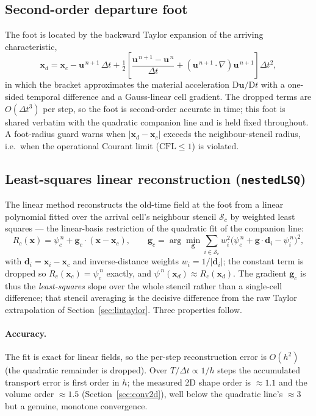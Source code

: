 \documentclass[preprint,3p,11pt]{elsarticle}
\newcommand{\psilev}{\psi}
\newcommand{\uvec}{\mathbf{u}}
\newcommand{\xc}{\mathbf{x}_c}
\newcommand{\xd}{\mathbf{x}_d}
\begin{document}
\subsection{Second-order departure foot}
\label{sec:foot}
The foot is located by the backward Taylor expansion of the arriving
characteristic,
\begin{equation}
  \xd = \xc - \uvec^{\,n+1}\,\Delta t
        + \tfrac12\!\left[\frac{\uvec^{\,n+1}-\uvec^{\,n}}{\Delta t}
                 + \left(\uvec^{\,n+1}\!\cdot\nabla\right)\uvec^{\,n+1}\right]\!\Delta t^{2},
  \label{eq:foot}
\end{equation}
in which the bracket approximates the material acceleration
$\mathrm{D}\uvec/\mathrm{D}t$ with a one-sided temporal difference and a
Gauss-linear cell gradient. The dropped terms are $O(\Delta t^{3})$ per
step, so the foot is second-order accurate in time; this foot is shared
verbatim with the quadratic companion line and is held fixed throughout. A
foot-radius guard warns when $|\xd-\xc|$ exceeds the neighbour-stencil
radius, i.e.\ when the operational Courant limit ($\mathrm{CFL}\le 1$) is
violated.

\subsection{Least-squares linear reconstruction (\texttt{nestedLSQ})}
\label{sec:recon}
The linear method reconstructs the old-time field at the foot from a linear
polynomial fitted over the arrival cell's neighbour stencil $\mathcal{S}_c$ by
weighted least squares --- the linear-basis restriction of the quadratic fit
of the companion line:
\begin{equation}
  R_c(\mathbf{x}) = \psilev^{\,n}_c + \mathbf{g}_c\cdot(\mathbf{x}-\xc),
  \qquad
  \mathbf{g}_c = \arg\min_{\mathbf{g}} \sum_{i\in\mathcal{S}_c}
      w_i^{2}\bigl(\psilev^{\,n}_c + \mathbf{g}\cdot\mathbf{d}_i - \psilev^{\,n}_i\bigr)^2 ,
  \label{eq:nestedlsq}
\end{equation}
with $\mathbf{d}_i=\mathbf{x}_i-\xc$ and inverse-distance weights
$w_i=1/\lvert\mathbf{d}_i\rvert$; the constant term is dropped so
$R_c(\xc)=\psilev^{\,n}_c$ exactly, and $\psilev^{\,n}(\xd)\approx R_c(\xd)$.
The gradient $\mathbf{g}_c$ is thus the \emph{least-squares} slope over the
whole stencil rather than a single-cell difference; that stencil averaging is
the decisive difference from the raw Taylor extrapolation of
Section~\ref{sec:lintaylor}. Three properties follow.

\paragraph{Accuracy.} The fit is exact for linear fields, so the per-step
reconstruction error is $O(h^{2})$ (the quadratic remainder is dropped). Over
$T/\Delta t \propto 1/h$ steps the accumulated transport error is first order
in $h$; the measured 2D shape order is $\approx1.1$ and the volume order
$\approx1.5$ (Section~\ref{sec:conv2d}), well below the quadratic line's
$\approx3$ but a genuine, monotone convergence.
\end{document}
